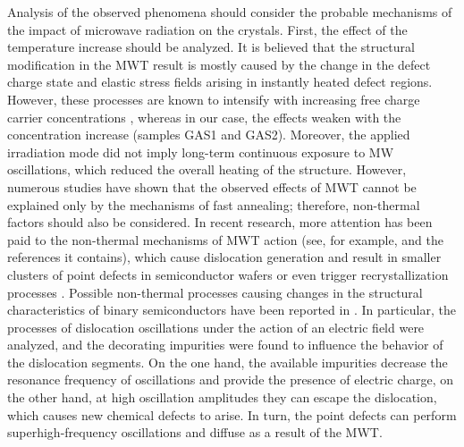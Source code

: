 \documentclass[10pt]{iopart}
\begin{document}
Analysis of the observed phenomena should consider
the probable mechanisms of the impact of microwave radiation on the crystals.
First, the effect of the temperature increase should be analyzed.
It is believed that the structural modification in the MWT result  is mostly caused by the change
in the defect charge state and elastic stress fields arising in instantly heated defect regions.
However, these processes are known to intensify with increasing free charge carrier concentrations \cite{MW:Rev},
whereas in our case, the effects weaken with the concentration increase (samples GAS1 and GAS2).
Moreover, the applied irradiation mode did not imply long-term continuous exposure to MW oscillations,
which reduced the overall heating of the structure.
However, numerous studies have shown that the observed effects of MWT cannot be explained only by the mechanisms of fast  annealing;
therefore, non-thermal factors should also be considered.
In recent research, more attention has been paid to the non-thermal mechanisms of MWT action
(see, for example, \cite{MW:Si2018} and the references it contains),
which cause dislocation generation and result in smaller  clusters of point defects in semiconductor wafers \cite{Konakova2007JTFEn}
or even trigger recrystallization processes \cite{MW:Si2018}.
Possible non-thermal processes causing changes in the structural characteristics of binary semiconductors have been reported in \cite{Konakova2007JTFEn}.
In particular, the processes of dislocation oscillations under the action of an electric field were analyzed,
and the decorating impurities were found to influence the behavior of the dislocation segments.
On the one hand, the available impurities decrease the resonance frequency of oscillations
and provide the presence of electric charge,
on the other hand, at high oscillation amplitudes they can escape the dislocation,
which causes new chemical defects to arise.
In turn, the point defects can perform superhigh-frequency oscillations and diffuse as a result of the MWT.
\end{document}
